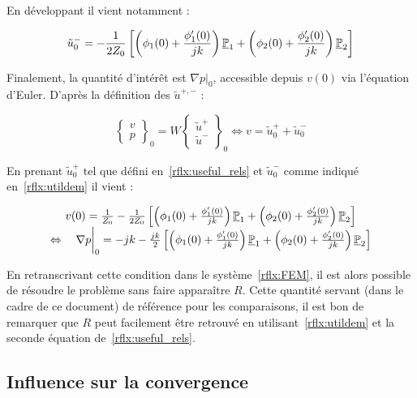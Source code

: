 En développant il vient notamment :

\begin{equation}
	\tilde{u}^-_0 = -\frac{1}{2Z_0}\left[\left(\phi_1(0) + \frac{\phi'_1(0)}{jk}\right)\underline{\mathbb{P}}_1 + \left(\phi_2(0) + \frac{\phi'_2(0)}{jk}\right)\underline{\mathbb{P}}_2 \right]\label{rflx:utildem}
\end{equation}

Finalement, la quantité d'intérêt est $\nabla p\big|_0$, accessible depuis $v(0)$ via l'équation d'Euler. D'après la
définition des $\tilde{u}^{+,-}$ :


\begin{equation}
\begin{Bmatrix}
	v\\p
\end{Bmatrix}_0
= W\begin{Bmatrix}
	\tilde{u}^+\\\tilde{u}^-
\end{Bmatrix}_0 \Leftrightarrow
v = \tilde{u}^+_0 + \tilde{u}^-_0
\label{rflx:def_v}
\end{equation}

En prenant $\tilde{u}^+_0$ tel que défini en~\eqref{rflx:useful_rels} et $\tilde{u}^-_0$ comme indiqué
en~\eqref{rflx:utildem} il vient :

\begin{equation*}
	\begin{array}{c}
	v(0) = \frac{1}{Z_0} -\frac{1}{2Z_0}\left[\left(\phi_1(0) + \frac{\phi'_1(0)}{jk}\right)\underline{\mathbb{P}}_1 + \left(\phi_2(0) + \frac{\phi'_2(0)}{jk}\right)\underline{\mathbb{P}}_2 \right]\\
	\Leftrightarrow\quad \nabla p\bigg|_0 = - jk -\frac{jk}{2}\left[\left(\phi_1(0) + \frac{\phi'_1(0)}{jk}\right)\underline{\mathbb{P}}_1 + \left(\phi_2(0) + \frac{\phi'_2(0)}{jk}\right)\underline{\mathbb{P}}_2 \right]
	\end{array}
\end{equation*}


En retranscrivant cette condition dans le système~\eqref{rflx:FEM}, il est alors possible de résoudre le problème sans
faire apparaître $R$. Cette quantité servant (dans le cadre de ce document) de référence pour les comparaisons, il est
bon de remarquer que $R$ peut facilement être retrouvé en utilisant~\eqref{rflx:utildem} et la seconde équation
de~\eqref{rflx:useful_rels}.

\subsection{Influence sur la convergence}

